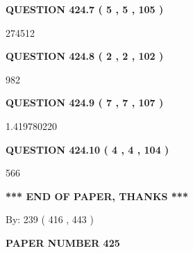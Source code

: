 \documentclass{ctexart}
\begin{document}
{\textbf{\Large{QUESTION
424.7 
 ( 5 , 5 , 105 )
}}}
  
  
 
 
\noindent{}

274512
 
 
  
\vspace{0.2in}
  
{\textbf{\Large{QUESTION
424.8 
 ( 2 , 2 , 102 )
}}}
  
  
 
 
\noindent{}

982
 
 
  
\vspace{0.2in}
  
{\textbf{\Large{QUESTION
424.9 
 ( 7 , 7 , 107 )
}}}
  
  
 
 
\noindent{}

1.419780220
 
 
  
\vspace{0.2in}
  
{\textbf{\Large{QUESTION
424.10 
 ( 4 , 4 , 104 )
}}}
  
  
 
 
\noindent{}

566
 
 
   
   
 \vspace{0.2in}
 
   
   
   
   
\vspace{1.0in} 
{\textbf{\large{ *** END OF PAPER, THANKS *** }}} 
   
   
\hspace{1.0in} By: 
 239 ( 416 ,  443 )
   
   
   
   
\newpage 
\setcounter{page}{ 
   425001 } 
   
   
   
   
 {\textbf{ \Large{ PAPER NUMBER  425  }}}
   
   
\vspace{0.2in}
   
\end{document}
